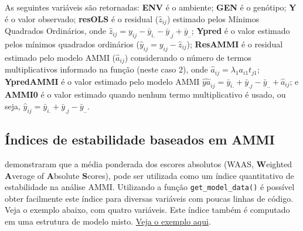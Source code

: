 \documentclass[
]{book}
\begin{document}
As seguintes variáveis são retornadas: \textbf{ENV} é o ambiente; \textbf{GEN} é o genótipo; \textbf{Y} é o valor observado; \textbf{resOLS} é o residual (\(\hat{z}_{ij}\)) estimado pelos Mínimos Quadrados Ordinários, onde \(\hat{z}_{ij} = y_{ij} - \bar{y}_{i.} - \bar{y}_{.j} + \bar{y}_{..}\); \textbf{Ypred} é o valor estimado pelos mínimos quadrados ordinários (\(\hat{y}_{ij} = y_{ij} -\hat{z}_{ij}\)); \textbf{ResAMMI} é o residual estimado pelo modelo AMMI (\(\hat{a}_{ij}\)) considerando o número de termos multiplicativos informado na função (neste caso 2), onde \(\hat{a}_{ij} = \lambda_1a_{i1}t_{j1}\); \textbf{YpredAMMI} é o valor estimado pelo modelo AMMI \(\hat{ya}_{ij} = \bar{y}_{i.} + \bar{y}_{.j} - \bar{y}_{..}+\hat{a}_{ij}\); e \textbf{AMMI0} é o valor estimado quando nenhum termo multiplicativo é usado, ou seja, \(\hat{y}_{ij} = \bar{y}_{i.} + \bar{y}_{.j} - \bar{y}_{..}\).

\hypertarget{uxedndices-de-estabilidade-baseados-em-ammi}{%
\subsection{Índices de estabilidade baseados em AMMI}\label{uxedndices-de-estabilidade-baseados-em-ammi}}

\citep{Olivoto2019} demonstraram que a média ponderada dos escores absolutos (WAAS, \textbf{W}eighted \textbf{A}verage of \textbf{A}bsolute \textbf{S}cores), pode ser utilizada como um índice quantitativo de estabilidade na análise AMMI. Utilizando a função \texttt{get\_model\_data()} é possível obter facilmente este índice para diversas variáveis com poucas linhas de código. Veja o exemplo abaixo, com quatro variáveis. Este índice também é computado em uma estrutura de modelo misto. \protect\hyperlink{wsb}{Veja o exemplo aqui}.
\end{document}
